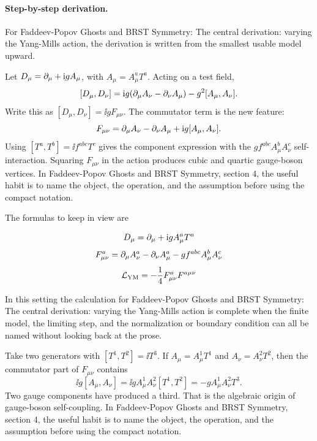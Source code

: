 \paragraph{Step-by-step derivation.}

For Faddeev-Popov Ghosts and BRST Symmetry: The central derivation: varying the Yang-Mills action, the derivation is written from the smallest usable model upward.

Let \(D_\mu=\partial_\mu+\mathrm i gA_\mu\), with \(A_\mu=A_\mu^aT^a\).  Acting on a test field,
\[
  [D_\mu,D_\nu]
  =
  \mathrm i g(\partial_\mu A_\nu-\partial_\nu A_\mu)-g^2[A_\mu,A_\nu].
\]
Write this as \([D_\mu,D_\nu]=\ii gF_{\mu\nu}\).  The commutator term is the new feature:
\[
  F_{\mu\nu}=\partial_\mu A_\nu-\partial_\nu A_\mu+\mathrm i g[A_\mu,A_\nu].
\]
Using \([T^a,T^b]=\ii f^{abc}T^c\) gives the component expression with the \(gf^{abc}A_\mu^bA_\nu^c\) self-interaction.  Squaring \(F_{\mu\nu}\) in the action produces cubic and quartic gauge-boson vertices.  In Faddeev-Popov Ghosts and BRST Symmetry, section 4, the useful habit is to name the object, the operation, and the assumption before using the compact notation.

The formulas to keep in view are

\[
  D_\mu=\partial_\mu+\mathrm i gA_\mu^aT^a
\]
\[
  F_{\mu\nu}^a=\partial_\mu A_\nu^a-\partial_\nu A_\mu^a-gf^{abc}A_\mu^bA_\nu^c
\]
\[
  \mathcal L_{\mathrm{YM}}=-\frac14F_{\mu\nu}^aF^{a\mu\nu}
\]

In this setting the calculation for Faddeev-Popov Ghosts and BRST Symmetry: The central derivation: varying the Yang-Mills action is complete when the finite model, the limiting step, and the normalization or boundary condition can all be named without looking back at the prose.




\begin{example}
Take two generators with \([T^1,T^2]=\ii T^3\).  If \(A_\mu=A_\mu^1T^1\) and \(A_\nu=A_\nu^2T^2\), then the commutator part of \(F_{\mu\nu}\) contains
\[
  \ii g[A_\mu,A_\nu]=\ii gA_\mu^1A_\nu^2[T^1,T^2]=-gA_\mu^1A_\nu^2T^3.
\]
Two gauge components have produced a third.  That is the algebraic origin of gauge-boson self-coupling.  In Faddeev-Popov Ghosts and BRST Symmetry, section 4, the useful habit is to name the object, the operation, and the assumption before using the compact notation.
\end{example}



